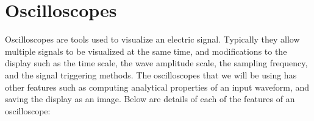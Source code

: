 \documentclass[main.tex]{subfile}
\begin{document}


\section{Oscilloscopes}
\label{sec:oscilloscope}

Oscilloscopes are tools used to visualize an electric signal. Typically they
allow multiple signals to be visualized at the same time, and modifications to
the display such as the time scale, the wave amplitude scale, the sampling
frequency, and the signal triggering methods. The oscilloscopes that we will be
using has other features such as computing analytical properties of an input
waveform, and saving the display as an image. Below are details of each of the
features of an oscilloscope:
\end{document}
